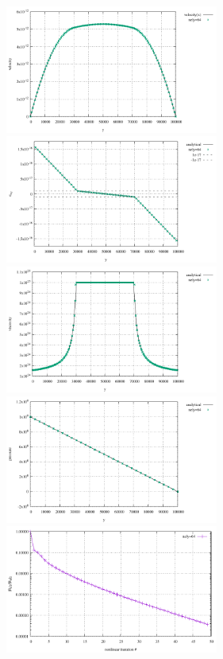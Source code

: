 \begin{center}
\includegraphics[width=7cm]{python_codes/fieldstone_61/results/n_1/velocity.pdf}
\includegraphics[width=7cm]{python_codes/fieldstone_61/results/n_1/exy.pdf}\\
\includegraphics[width=7cm]{python_codes/fieldstone_61/results/n_1/eta.pdf}
\includegraphics[width=7cm]{python_codes/fieldstone_61/results/n_1/press.pdf}\\
\includegraphics[width=7cm]{python_codes/fieldstone_61/results/n_1/nonlinear_conv.pdf}
\end{center}

